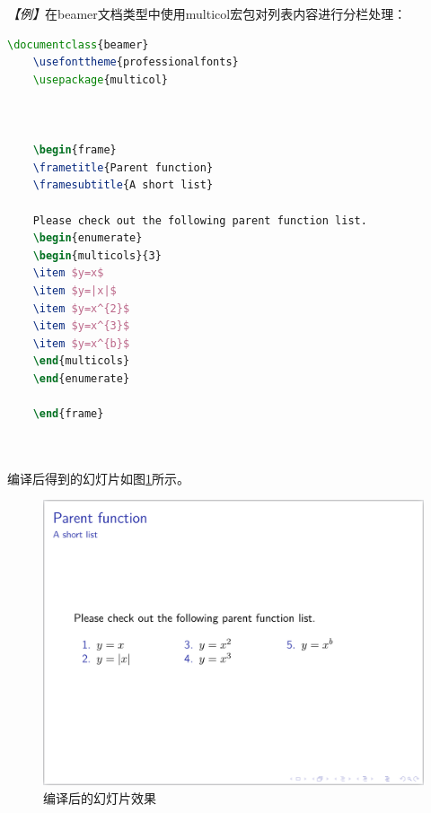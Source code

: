 \emph{【例】}在beamer文档类型中使用multicol宏包对列表内容进行分栏处理：
\begin{lstlisting}[language=TeX]
    \documentclass{beamer}
    \usefonttheme{professionalfonts}
    \usepackage{multicol}

    

    \begin{frame}
    \frametitle{Parent function}
    \framesubtitle{A short list}

    Please check out the following parent function list.
    \begin{enumerate}
    \begin{multicols}{3}
    \item $y=x$
    \item $y=|x|$
    \item $y=x^{2}$
    \item $y=x^{3}$
    \item $y=x^{b}$
    \end{multicols}
    \end{enumerate}

    \end{frame}

    
\end{lstlisting}

编译后得到的幻灯片如图\ref{fig:910}所示。

\begin{figure}[htbp]
    \centering
    \includegraphics[width = 0.6\linewidth]{images/ch_9/example_multicol.png}
    \caption{编译后的幻灯片效果}
    \label{fig:910}
\end{figure}

